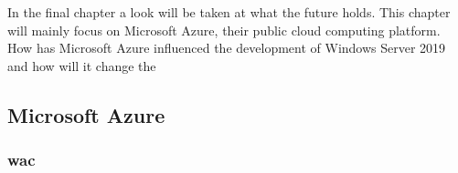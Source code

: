 
\chapter{}
\label{ch:toekomstvisie}
In the final chapter a look will be taken at what the future holds. This chapter will mainly focus on Microsoft Azure, their public cloud computing platform. How has Microsoft Azure influenced the development of Windows Server 2019 and how will it change the 

\section{Microsoft Azure}

\subsection{\acrfull{wac}}

